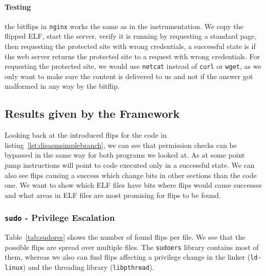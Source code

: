 \paragraph{Testing} the bitflips in \texttt{nginx} works the same as in the
instrumentation. We copy the flipped ELF, start the server, verify it is running
by requesting a standard page, then requesting the protected site with wrong
credentials, a successful state is if the web server returns the protected site
to a request with wrong credentials. For requesting the protected site, we would
use \texttt{netcat} instead of \texttt{curl} or \texttt{wget}, as we only want
to make sure the content is delivered to us and not if the answer got malformed
in any way by the bitflip.

\subsection{Results given by the Framework}

Looking back at the introduced flips for the code in
listing~\ref{lst:disasmsimplebranch}, we can see that permission checks can be
bypassed in the same way for both programs we looked at. As at some point jump
instructions will point to code executed only in a successful state. We can also
see flips causing a success which change bits in other sections than the code
one. We want to show which ELF files have bits where flips would cause
successes and what areas in ELF files are most promising for flips to be found.

\subsubsection{\texttt{sudo} - Privilege Escalation}

Table~\ref{tab:sudores} shows the number of found flips per file. We see that
the possible flips are spread over multiple files.  The \texttt{sudoers} library
contains most of them, whereas we also can find flips affecting a privilege
change in the linker (\texttt{ld-linux}) and the threading library
(\texttt{libpthread}).

